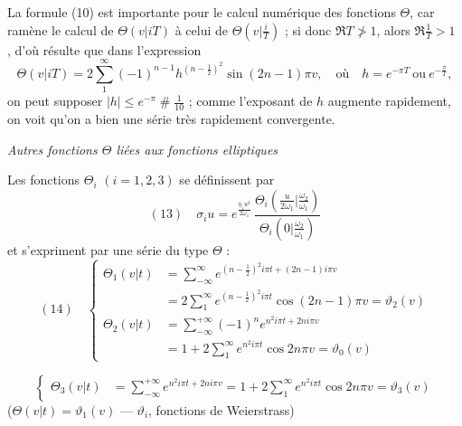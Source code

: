 \documentclass[11pt,a4paper]{article}
\begin{document}
La formule (10) est importante pour le calcul numérique des fonctions
$\Theta$, car ramène le calcul de $\Theta(v|iT)$ à celui de
$\Theta(v|\frac{i}{T})$ ; si donc $\Re T \ngtr 1$, alors 
$\Re\frac{1}{T} > 1$ , d'où résulte que dans
l'expression
\[
\Theta(v|iT) = 2\sum_{1}^{\infty}(-1)^{n-1}h^{(n-\frac12)^2}\sin(2n-1)\pi v,
\quad\text{où}\quad h = e^{-\pi T}\ \text{ou}\ e^{-\frac{\pi}{T}},
\]
on peut supposer $|h| \leq e^{-\pi} \mathbin{\#} \frac{1}{10}$ ; comme l'exposant de
$h$ augmente rapidement, on voit qu'on a bien une série très rapidement
convergente.

\emph{Autres fonctions $\Theta$ liées aux fonctions elliptiques}

Les fonctions $\Theta_i$ $(i=1,2,3)$ se définissent par
\[
(13)\quad \sigma_i u = e^{\frac{\eta_1 u^2}{2\omega_1}}\,
\frac{\Theta_i(\frac{u}{2\omega_1}|\frac{\omega_2}{\omega_1})}{\Theta_i(0|\frac{\omega_2}{\omega_1})}
\]
et s'expriment par une série du type $\Theta$ :
\[
(14)\quad \left\lbrace
\begin{aligned}
\Theta_1(v|t) &= \sum_{-\infty}^{\infty} e^{(n-\frac12)^2 i\pi t + (2n-1)i\pi v}\\
&= 2\sum_{1}^{\infty} e^{(n-\frac12)^2 i\pi t}\cos(2n-1)\pi v = \vartheta_2(v)\\
\Theta_2(v|t) &= \sum_{-\infty}^{+\infty}(-1)^n e^{n^2 i\pi t + 2ni\pi v}\\
&= 1 + 2\sum_{1}^{\infty} e^{n^2 i\pi t}\cos 2n\pi v = \vartheta_0(v)
\end{aligned}
\right.
\]

\[
\left\lbrace
\begin{aligned}
\Theta_3(v|t) &= \sum_{-\infty}^{+\infty} e^{n^2 i\pi t + 2ni\pi v}
= 1 + 2\sum_{1}^{\infty} e^{n^2 i\pi t}\cos 2n\pi v = \vartheta_3(v)
\end{aligned}
\right.
\]
($\Theta(v|t) = \vartheta_1(v)$ --- $\vartheta_i$, fonctions de
Weierstrass)
\end{document}
